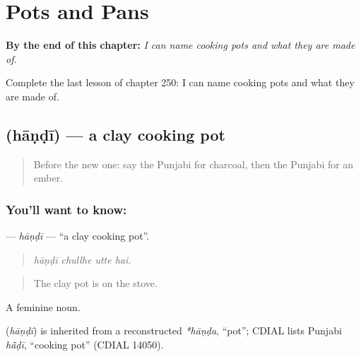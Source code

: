 
\chapter{Pots and Pans}
\label{ch:pa-a2-pots-and-pans}

\begin{chapteropening}
\textbf{By the end of this chapter:} \emph{I can name cooking pots and what they are made of.}

Complete the last lesson of chapter 250: I can name cooking pots and what they are made of.
\end{chapteropening}

\section[\texorpdfstring{\pa{ਹਾਂਡੀ} (hāṇḍī)}{ਹਾਂਡੀ (hāṇḍī)}]{ (hāṇḍī) — a clay cooking pot}

\label{lesson:PA-C250-handi}



\begin{quote}
Before the new one: say the Punjabi for charcoal, then the Punjabi for an ember.
\end{quote}

\subsection*{You'll want to know: }
\textbf{} — \emph{hāṇḍī} — \textquotedblleft{}a clay cooking pot\textquotedblright{}.

\begin{quote}
   
\end{quote}

\begin{quote}
\emph{hāṇḍī chullhe utte hai.}
\end{quote}

\begin{quote}
The clay pot is on the stove.
\end{quote}

A feminine noun.

\begin{cousinweb}
\textbf{} (\emph{hāṇḍī}) is inherited from a reconstructed \emph{*hāṇḍa}, \textquotedblleft{}pot\textquotedblright{}; CDIAL lists Punjabi \emph{hā̃ḍī}, \textquotedblleft{}cooking pot\textquotedblright{} (CDIAL 14050).
\end{cousinweb}

